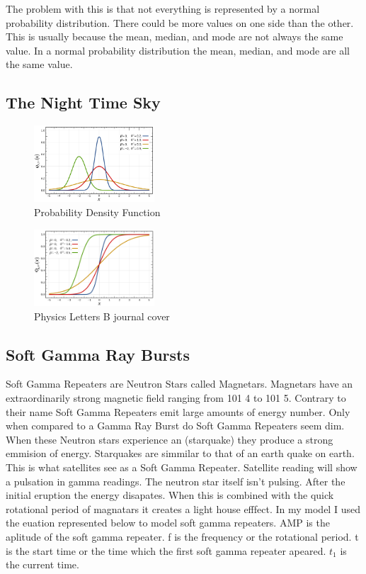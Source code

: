 \documentclass[final,8p,times,twocolumn,authoryear]{elsarticle}
\begin{document}
The problem with this is that not everything is represented by a normal probability distribution. There could be more values on one side than the other. This is usually because the mean, median, and mode are not always the same value. In a normal probability distribution the mean, median, and mode are all the same value. 


\subsection{The Night Time Sky}

\begin{figure}
	\centering 
	\includegraphics[width=0.4\textwidth, angle=-0]{1024px-norm.png}	
	\caption{Probability Density Function} 
	\label{fig_mom0}%
\end{figure}

\begin{figure}
	\centering 
	\includegraphics[width=0.4\textwidth, angle=-0]{800px-dist.png}	
	\caption{Physics Letters B journal cover} 
	\label{fig_mom0}%
\end{figure}

\subsection{Soft Gamma Ray Bursts}

Soft Gamma Repeaters are Neutron Stars called Magnetars. Magnetars have an extraordinarily strong magnetic field ranging from 101 4 to 101 5. Contrary to their name Soft Gamma Repeaters emit large amounts of energy number. Only when compared to a Gamma Ray Burst do Soft Gamma Repeaters seem dim. When these Neutron stars experience an (starquake) they produce a strong emmision of energy. Starquakes are simmilar to that of an earth quake on earth. This is what satellites see as a Soft Gamma Repeater. Satellite reading will show a pulsation in gamma readings. The neutron star itself isn’t pulsing.  After the initial eruption the energy disapates. When this is combined with the quick rotational period of magnatars it creates a light house efffect. In my model I used the euation represented below to model soft gamma repeaters. AMP is the aplitude of the soft gamma repeater. f is the frequency or the rotational period. t is the start time or the time which the first soft gamma repeater apeared. $t_1$ is the current time. 
\end{document}
